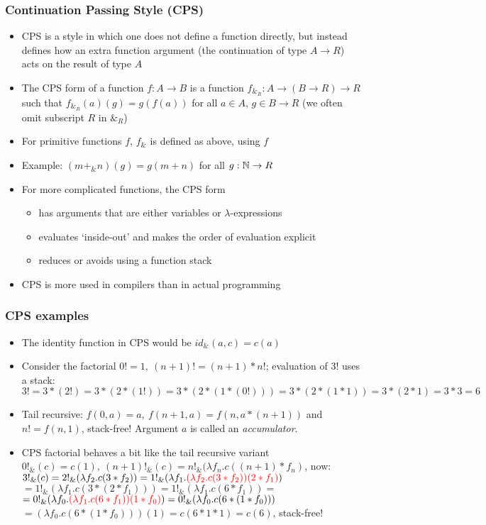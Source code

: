 \documentclass[handout]{beamer}
\begin{document}
\frame
  {   
    \frametitle{Continuation Passing Style (CPS)}\label{Mon5:CPS}

 \begin{itemize}[<+->]
\item CPS is a style in which one does not define a function directly, but instead
defines how an extra function argument (the continuation of type $A\to R$) 
acts on the result of type $A$
\item The CPS form of a function $f: A\to B$ is a function $f_{\&_R} : A\to(B\to R)\to R$
such that $f_{\&_R} (a)(g) = g(f(a))$ for all $a\in A$, $g\in B\to R$ 
(we often omit subscript $R$ in $\&_R$)
\item For primitive functions $f$, $f_\&$ is defined as above, using $f$
\item Example: $(m+_\& n)(g) = g(m+n)$ for all $g:\mathbb{N}\to R$
\item For more complicated functions, the CPS form
\begin{itemize}
    \item has arguments that are either variables or $\lambda$-expressions
    \item evaluates `inside-out' and makes the order of evaluation explicit
    \item reduces or avoids using a function stack
 \end{itemize}
\item CPS is more used in compilers than in actual programming
 \end{itemize}

 }

\frame
  {   
    \frametitle{CPS examples}\label{Mon5:CPS}

 \begin{itemize}[<+->]
\item The identity function in CPS would be $id_\& (a,c) = c(a)$
\item Consider the factorial $0! = 1,~(n+1)! = (n+1)*n!$; evaluation of 3! uses a stack:
$3! = 3*(2!) = 3*(2*(1!)) = 3*(2*(1*(0!))) = 3*(2*(1*1)) = 3*(2*1) = 3*3 = 6$
\item Tail recursive: $f(0,a) = a,~f(n+1,a) = f(n,a*(n+1))$ and $n! = f(n,1)$, stack-free!
Argument $a$ is called an \emph{accumulator}.
\item CPS factorial behaves a bit like the tail recursive variant
$0!_\&(c) = c(1),~(n+1)!_\&(c) = n!_\&(\lambda f_n. c((n+1)*f_n)$, now:\vspace*{2mm}
$3!_\&(c) = 2!_\&(\lambda f_2. c(3*f_2)) = 1!_\&(\lambda f_1. 
{\color{red}(\lambda f_2. c(3*f_2))(2*f_1)})$
$= 1!_\&(\lambda f_1. c(3*(2*f_1))) = 1!_\&(\lambda f_1. c(6*f_1)) =$
$= 0!_\&(\lambda f_0. 
{\color{red}(\lambda f_1. c(6*f_1))(1*f_0)}) = 0!_\&(\lambda f_0. c(6*(1*f_0))) $
$= (\lambda f_0. c(6*(1*f_0))) (1) = c(6*1*1) = c(6)$, stack-free!
\end{itemize}

 }
\end{document}
